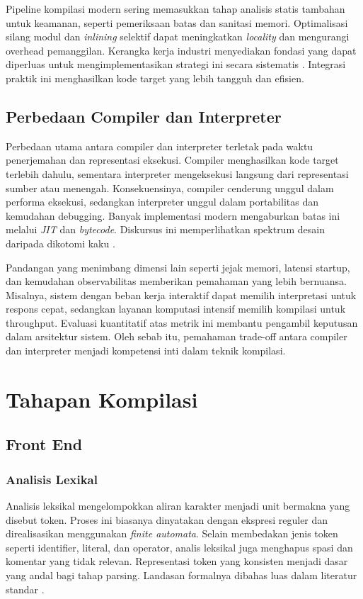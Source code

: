 \documentclass[../main.tex]{subfiles}
\begin{document}
Pipeline kompilasi modern sering memasukkan tahap analisis statis tambahan untuk keamanan, seperti pemeriksaan batas dan sanitasi memori. Optimalisasi silang modul dan \emph{inlining} selektif dapat meningkatkan \emph{locality} dan mengurangi overhead pemanggilan. Kerangka kerja industri menyediakan fondasi yang dapat diperluas untuk mengimplementasikan strategi ini secara sistematis \citep{LLVMOverview,GCCInternals}. Integrasi praktik ini menghasilkan kode target yang lebih tangguh dan efisien.

\subsection{Perbedaan Compiler dan Interpreter}
Perbedaan utama antara compiler dan interpreter terletak pada waktu penerjemahan dan representasi eksekusi. Compiler menghasilkan kode target terlebih dahulu, sementara interpreter mengeksekusi langsung dari representasi sumber atau menengah. Konsekuensinya, compiler cenderung unggul dalam performa eksekusi, sedangkan interpreter unggul dalam portabilitas dan kemudahan debugging. Banyak implementasi modern mengaburkan batas ini melalui \emph{JIT} dan \emph{bytecode}. Diskursus ini memperlihatkan spektrum desain daripada dikotomi kaku \citep{CS143}.

Pandangan yang menimbang dimensi lain seperti jejak memori, latensi startup, dan kemudahan observabilitas memberikan pemahaman yang lebih bernuansa. Misalnya, sistem dengan beban kerja interaktif dapat memilih interpretasi untuk respons cepat, sedangkan layanan komputasi intensif memilih kompilasi untuk throughput. Evaluasi kuantitatif atas metrik ini membantu pengambil keputusan dalam arsitektur sistem. Oleh sebab itu, pemahaman trade-off antara compiler dan interpreter menjadi kompetensi inti dalam teknik kompilasi.

\section{Tahapan Kompilasi}
\subsection{Front End}
\subsubsection{Analisis Lexikal}
Analisis leksikal mengelompokkan aliran karakter menjadi unit bermakna yang disebut token. Proses ini biasanya dinyatakan dengan ekspresi reguler dan direalisasikan menggunakan \emph{finite automata}. Selain membedakan jenis token seperti identifier, literal, dan operator, analis leksikal juga menghapus spasi dan komentar yang tidak relevan. Representasi token yang konsisten menjadi dasar yang andal bagi tahap parsing. Landasan formalnya dibahas luas dalam literatur standar \citep{WikiRegex,WikiDFA,WikiNFA}.
\end{document}
